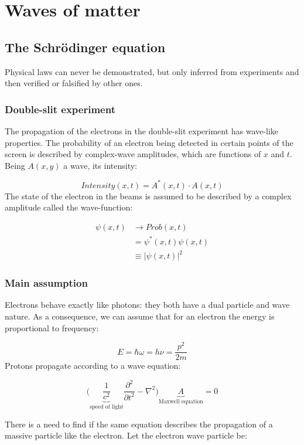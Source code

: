 \graphicspath{{chapters/03/}}
\chapter{Waves of matter}

\section{The Schr\"odinger equation}
Physical laws can never be demonstrated, but only inferred from experiments and then verified or falsified by other ones.


  \subsection{Double-slit experiment}
  The propagation of the electrons in the double-slit experiment has wave-like properties.
  The probability of an electron being detected in certain points of the screen is described by complex-wave amplitudes, which are functions of $x$ and $t$. Being $A(x,y)$ a wave, its intensity:

  $$Intensity(x,t) = A^*(x,t)\cdot A(x,t)$$
\noindent
  The state of the electron in the beams is assumed to be described by a complex amplitude called the wave-function:

  \begin{align*}
    \psi(x,t) &\rightarrow Prob(x,t)\\
              &=\psi^*(x,t)\psi(x,t)\\
              &\equiv |\psi(x,t)|^2
  \end{align*}

  \subsection{Main assumption}
  Electrons behave exactly like photons: they both have a dual particle and wave nature.
  As a consequence, we can assume that for an electron the energy is proportional to frequency:

  $$E = \hbar\omega = h\nu = \frac{p^2}{2m}$$
\noindent
  Protons propagate according to a wave equation:

  $$\biggl(\underbrace{\frac{1}{c^2}}_{\text{speed of light}}\frac{\partial^2{}}{\partial{t^2}} - \nabla^2\biggr)\underbrace{A}_{\text{Maxwell equation}} = 0$$

\noindent
  There is a need to find if the same equation describes the propagation of a massive particle like the electron.
  Let the electron wave particle be:

